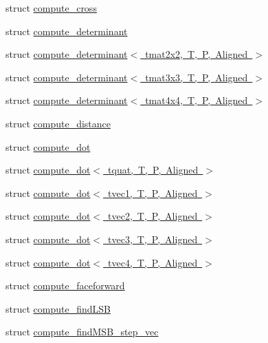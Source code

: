 \begin{DoxyCompactItemize}
\item 
struct \mbox{\hyperlink{structglm_1_1detail_1_1compute__cross}{compute\+\_\+cross}}
\item 
struct \mbox{\hyperlink{structglm_1_1detail_1_1compute__determinant}{compute\+\_\+determinant}}
\item 
struct \mbox{\hyperlink{structglm_1_1detail_1_1compute__determinant_3_01tmat2x2_00_01_t_00_01_p_00_01_aligned_01_4}{compute\+\_\+determinant$<$ tmat2x2, T, P, Aligned $>$}}
\item 
struct \mbox{\hyperlink{structglm_1_1detail_1_1compute__determinant_3_01tmat3x3_00_01_t_00_01_p_00_01_aligned_01_4}{compute\+\_\+determinant$<$ tmat3x3, T, P, Aligned $>$}}
\item 
struct \mbox{\hyperlink{structglm_1_1detail_1_1compute__determinant_3_01tmat4x4_00_01_t_00_01_p_00_01_aligned_01_4}{compute\+\_\+determinant$<$ tmat4x4, T, P, Aligned $>$}}
\item 
struct \mbox{\hyperlink{structglm_1_1detail_1_1compute__distance}{compute\+\_\+distance}}
\item 
struct \mbox{\hyperlink{structglm_1_1detail_1_1compute__dot}{compute\+\_\+dot}}
\item 
struct \mbox{\hyperlink{structglm_1_1detail_1_1compute__dot_3_01tquat_00_01_t_00_01_p_00_01_aligned_01_4}{compute\+\_\+dot$<$ tquat, T, P, Aligned $>$}}
\item 
struct \mbox{\hyperlink{structglm_1_1detail_1_1compute__dot_3_01tvec1_00_01_t_00_01_p_00_01_aligned_01_4}{compute\+\_\+dot$<$ tvec1, T, P, Aligned $>$}}
\item 
struct \mbox{\hyperlink{structglm_1_1detail_1_1compute__dot_3_01tvec2_00_01_t_00_01_p_00_01_aligned_01_4}{compute\+\_\+dot$<$ tvec2, T, P, Aligned $>$}}
\item 
struct \mbox{\hyperlink{structglm_1_1detail_1_1compute__dot_3_01tvec3_00_01_t_00_01_p_00_01_aligned_01_4}{compute\+\_\+dot$<$ tvec3, T, P, Aligned $>$}}
\item 
struct \mbox{\hyperlink{structglm_1_1detail_1_1compute__dot_3_01tvec4_00_01_t_00_01_p_00_01_aligned_01_4}{compute\+\_\+dot$<$ tvec4, T, P, Aligned $>$}}
\item 
struct \mbox{\hyperlink{structglm_1_1detail_1_1compute__faceforward}{compute\+\_\+faceforward}}
\item 
struct \mbox{\hyperlink{structglm_1_1detail_1_1compute__find_l_s_b}{compute\+\_\+find\+L\+SB}}
\item 
struct \mbox{\hyperlink{structglm_1_1detail_1_1compute__find_m_s_b__step__vec}{compute\+\_\+find\+M\+S\+B\+\_\+step\+\_\+vec}}

\end{DoxyCompactItemize}
